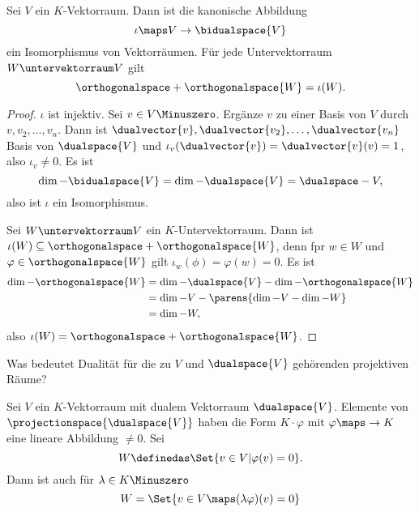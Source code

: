 \begin{satz}
  Sei \( V \) ein \( K \)-Vektorraum. Dann ist die kanonische Abbildung
  \begin{equation*}
    \iota\maps V\to \bidualspace{V}
  \end{equation*}
  ein Isomorphismus von Vektorräumen. Für jede Untervektorraum \( W\untervektorraum V \) gilt
  \begin{equation*}
    \orthogonalspace+{\orthogonalspace{W}}=\iota(W).
  \end{equation*}
\end{satz}
\begin{proof}
  \( \iota \) ist injektiv. Sei \( v\in V\Minuszero \). Ergänze \( v \) zu einer Basis von \( V \) durch \( v,v_2,\dotsc,v_n \). Dann ist \( \dualvector{v},\dualvector{v_2},\dotsc,\dualvector{v_n} \) Basis von \( \dualspace{V} \) und \( \iota_v(\dualvector{v})=\dualvector{v}(v)=1 \), also \( \iota_v\neq 0 \). Es ist 
  \begin{equation*}
    \dim-{\bidualspace{V}}=\dim-{\dualspace{V}}=\dualspace-{V},
  \end{equation*}
  also ist \( \iota \) ein Isomorphismus.

  Sei \( W\untervektorraum V \) ein \( K \)-Untervektorraum. Dann ist \( \iota(W)\subseteq \orthogonalspace+{\orthogonalspace{W}} \), denn fpr \( w\in W \) und \( \varphi\in \orthogonalspace{W} \) gilt \( \iota_w(\phi)=\varphi(w)=0 \). Es ist
  \begin{align*}
    \dim-{\orthogonalspace{W}}&=\dim-{\dualspace{V}}-\dim-{\orthogonalspace{W}}\\
    &=\dim-{V}-\parens{\dim-{V}-\dim-{W}}\\
    &=\dim-{W},
  \end{align*}
  also \( \iota(W)=\orthogonalspace+{\orthogonalspace{W}} \).
\end{proof}
\begin{frage*}
  Was bedeutet Dualität für die zu \( V \) und \( \dualspace{V} \) gehörenden projektiven Räume?
\end{frage*}
Sei \( V \) ein \( K \)-Vektorraum mit dualem Vektorraum \( \dualspace{V} \). Elemente von \( \projectionspace{\dualspace{V}} \) haben die Form \( K\cdot \varphi \) mit \( \varphi\maps \to K \) eine lineare Abbildung \( \neq 0 \). Sei 
\begin{equation*}
  W\definedas \Set{v\in V|\varphi(v)=0}.
\end{equation*}
Dann ist auch für \( \lambda\in K\Minuszero \)
\begin{equation*}
  W=\Set{v\in V\maps (\lambda \varphi)(v)=0}
\end{equation*}
